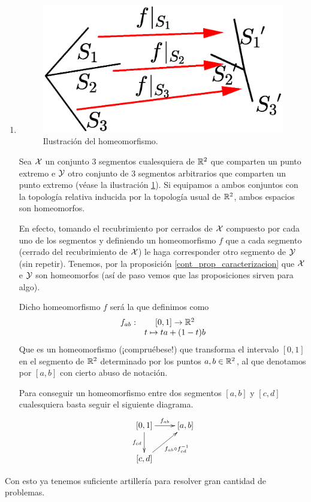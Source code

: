 \begin{exa}[Homeomorfismos]
\begin{enumerate}
		\item \begin{figure}[h!]
			\centering
			\includegraphics[scale = 0.3]{img/segmentos}
			\caption{Ilustración del homeomorfismo.}
			\label{cont_img_sementos}
		\end{figure}
		
		Sea $\mathcal{X}$ un conjunto $3$ segmentos cualesquiera de $\mathbb{R}^2$ que comparten un punto extremo e $\mathcal{Y}$ otro conjunto de $3$ segmentos arbitrarios que comparten un punto extremo (véase la ilustración \ref{cont_img_sementos}). Si equipamos a ambos conjuntos con la topología relativa inducida por la topología usual de $\mathbb{R}^2$, ambos espacios son homeomorfos.
		
		En efecto, tomando el recubrimiento por cerrados de $\mathcal{X}$ compuesto por cada uno de los segmentos y definiendo un homeomorfismo $f$ que a cada segmento (cerrado del recubrimiento de $\mathcal{X}$) le haga corresponder otro segmento de $\mathcal{Y}$ (sin repetir). Tenemos, por la proposición \ref{cont_prop_caracterizacion} que $\mathcal{X}$ e $\mathcal{Y}$ son homeomorfos (así de paso vemos que las proposiciones sirven para algo).
		
		Dicho homeomorfismo $f$ será la  que definimos como
		\begin{equation}
			\begin{array}{cc}
			f_{ab}:&[0,1]\to\mathbb{R}^2\\
			& t\mapsto ta+(1-t)b
			\end{array}
		\end{equation}
		Que es un homeomorfismo (¡compruébese!) que transforma el intervalo $[0,1]$ en el segmento de $\mathbb{R}^2$ determinado por los puntos $a,b\in\mathbb{R}^2$, al que denotamos por $[a,b]$ con cierto abuso de notación.
		
		Para conseguir un homeomorfismo entre dos segmentos $[a,b]$ y $[c,d]$ cualesquiera basta seguir el siguiente diagrama.
		\[\xymatrix{[0,1]\ar[r]^{f_{ab}}\ar[d]_{f_{cd}}&[a,b]\\
			[c,d]\ar[ru]_{f_{ab}\circ f^{-1}_{cd}}
			}\]
	\end{enumerate}
	Con esto ya tenemos suficiente artillería para resolver gran cantidad de problemas.
\end{exa}

